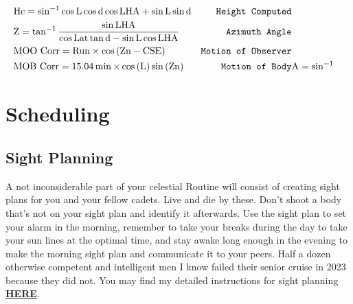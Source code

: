 \documentclass[letterpaper,12pt]{article}
\begin{document}
\begin{align}
    &\text{Hc}=\sin^{-1}{\cos{\text{L}}\cos{\text{d}}\cos{\text{LHA}}+\sin{\text{L}}\sin{\text{d}}}  &\text{\texttt{Height Computed}}\\
    &\text{Z}=\tan^{-1}{\frac{\sin{\text{LHA}}}{\cos{\text{Lat}\tan\text{{d}}-\sin{\text{L}}\cos{\text{LHA}}}}}   &\text{\texttt{Azimuth Angle}}\\
    &\text{MOO Corr}=\text{Run}\times\cos{(\text{Zn}-\text{CSE})}  &\text{\texttt{Motion of Observer}}\\
    &\text{MOB Corr}=15.04\min\times\cos{(\text{L})}\sin{(\text{Zn})}   &\text{\texttt{Motion of Body}}
    &\text{A}=\sin^{-1}
\end{align}
\section{Scheduling}
\subsection{Sight Planning}
A not inconsiderable part of your celestial Routine will consist of creating sight plans for you and your fellow cadets. Live and die by these. Don't shoot a body that's not on your sight plan and identify it afterwards. Use the sight plan to set your alarm in the morning, remember to take your breaks during the day to take your sun lines at the optimal time, and stay awake long enough in the evening to make the morning sight plan and communicate it to your peers. Half a dozen otherwise competent and intelligent men I know failed their senior cruise in 2023 because they did not. You may find my detailed instructions for sight planning \hyperlink{https://www.csum.edu/tutoring/media/celnavjoey.pdf}{\textbf{HERE}}.
\end{document}
